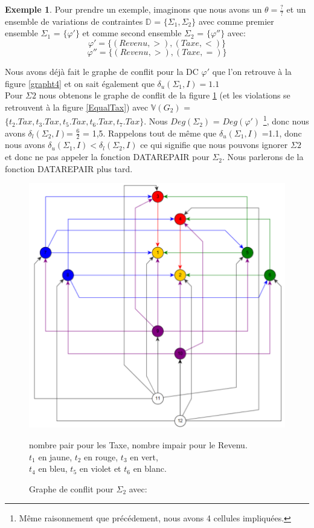\documentclass[letterpaper, 12pt]{report}
\theoremstyle{definition}
\newtheorem{myexample}{Exemple}
\begin{document}
\begin{myexample}

Pour prendre un exemple, imaginons que nous avons un $\theta = \frac{?}{?}$ et un ensemble de variations de contraintes $\mathbb{D}$ = $\{\Sigma_1,\Sigma_2\}$ avec comme premier ensemble $\Sigma_1$ = $\{\varphi'\}$ et comme second ensemble $\Sigma_2$ = $\{\varphi''\}$ avec:
$$ \varphi' = \{(Revenu,>),(Taxe,<) \} $$
$$ \varphi'' = \{(Revenu,>),(Taxe,=) \} $$

Nous avons déjà fait le graphe de conflit pour la DC $\varphi'$ que l'on retrouve à la figure \ref{grapht4} et on sait également que $\delta_u(\Sigma_1,I) =1.1$\\

Pour $\Sigma2$ nous obtenons le graphe de conflit de la figure \ref{graphSigma2} (et les violations se retrouvent à la figure \ref{EqualTax}) avec $\mathbb{V}(G_2)$ = $\{ t_2.Tax,t_3.Tax,t_5.Tax,t_6.Tax,t_7.Tax\}$. Nous $Deg(\Sigma_2)$ = $Deg(\varphi')$ \footnote{Même raisonnement que précédement, nous avons 4 cellules impliquées.}, donc nous avons $\delta_l(\Sigma_2,I)$= $\frac{6}{2}$ = 1,5. Rappelons tout de même que $\delta_u(\Sigma_1,I)$ =1.1, donc nous avons $\delta_u(\Sigma_1,I) < \delta_l(\Sigma_2,I)$ ce qui signifie que nous pouvons ignorer $\Sigma2$ et donc ne pas appeler la fonction DATAREPAIR pour $\Sigma_2$. Nous parlerons de la fonction DATAREPAIR plus tard.



\begin{figure}
\centering
\hspace*{-1.8cm} \includegraphics[scale=0.565]{img/graph2}
\caption{\label{graphSigma2}Graphe de conflit pour $\Sigma_2$ avec:}
	nombre pair pour les Taxe, nombre impair pour le Revenu. \\
	$t_1$ en jaune, $t_2$ en rouge, $t_3$ en vert,\\
	$t_4$ en bleu, $t_5$ en violet et $t_6$ en blanc.
\end{figure}


\end{myexample}
\end{document}
